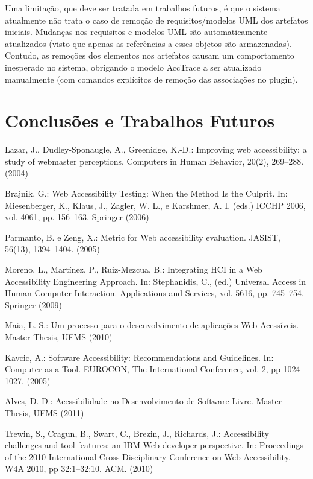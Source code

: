 \documentclass[runningheads,a4paper]{llncs}
\begin{document}
Uma limitação, que deve ser tratada em trabalhos futuros, é que o sistema
atualmente não trata o caso de remoção de requisitos/modelos UML dos
artefatos iniciais. Mudanças nos requisitos e modelos UML são automaticamente atualizados (visto que apenas as referências a esses objetos são armazenadas).
Contudo, as remoções dos elementos nos artefatos causam um comportamento
inesperado no sistema, obrigando o modelo AccTrace a ser atualizado
manualmente (com comandos explícitos de remoção das associações no
plugin).

\section{Conclusões e Trabalhos Futuros}




\begin{thebibliography}{4}

 Lazar, J., Dudley-Sponaugle, A.,  Greenidge, K.-D.: Improving web accessibility:
a study of webmaster perceptions. Computers in Human Behavior, 20(2), 269--288. (2004)

 Brajnik, G.: Web Accessibility Testing: When the Method Is the Culprit. In: Miesenberger, K., Klaus, J., Zagler, W. L., e Karshmer, A. I. (eds.) ICCHP 2006, vol. 4061, pp. 156--163. Springer (2006)

 Parmanto, B. e Zeng, X.: Metric for Web accessibility evaluation. JASIST, 56(13), 1394--1404. (2005)

 Moreno, L., Martínez, P., Ruiz-Mezcua, B.: Integrating HCI in a Web Accessibility Engineering Approach. In: Stephanidis, C., (ed.) Universal Access in Human-Computer Interaction. Applications and Services, vol. 5616, pp. 745--754. Springer (2009)

 Maia, L. S.: Um processo para o desenvolvimento de aplicações Web Acessíveis.
Master Thesis, UFMS (2010)

 Kavcic, A.: Software Accessibility: Recommendations and Guidelines. In: Computer as a Tool. EUROCON, The International Conference, vol. 2, pp 1024--1027. (2005)

 Alves, D. D.: Acessibilidade no Desenvolvimento de Software Livre. Master Thesis, UFMS (2011)

 Trewin, S., Cragun, B., Swart, C., Brezin, J., Richards, J.: Accessibility challenges
and tool features: an IBM Web developer perspective. In: Proceedings of the
2010 International Cross Disciplinary Conference on Web Accessibility. W4A 2010, pp 32:1--32:10. ACM. (2010)


\end{thebibliography}
\end{document}

